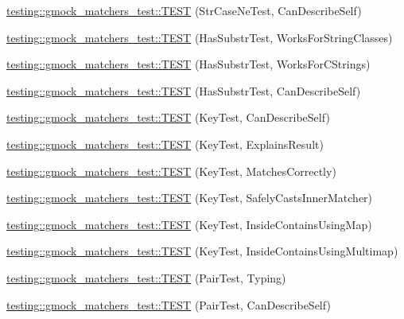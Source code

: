 \begin{DoxyCompactItemize}
\item 
\hyperlink{namespacetesting_1_1gmock__matchers__test_ae953891c7961b6ffd51dc712be8d24de}{testing\+::gmock\+\_\+matchers\+\_\+test\+::\+T\+E\+ST} (Str\+Case\+Ne\+Test, Can\+Describe\+Self)
\item 
\hyperlink{namespacetesting_1_1gmock__matchers__test_a2a1043a0b8bfb4bc0b5fb539317132a3}{testing\+::gmock\+\_\+matchers\+\_\+test\+::\+T\+E\+ST} (Has\+Substr\+Test, Works\+For\+String\+Classes)
\item 
\hyperlink{namespacetesting_1_1gmock__matchers__test_a147dde340ba8f77308cd116d3bb831d6}{testing\+::gmock\+\_\+matchers\+\_\+test\+::\+T\+E\+ST} (Has\+Substr\+Test, Works\+For\+C\+Strings)
\item 
\hyperlink{namespacetesting_1_1gmock__matchers__test_ae47e8ad8f8a4a33ac08b596eb839380e}{testing\+::gmock\+\_\+matchers\+\_\+test\+::\+T\+E\+ST} (Has\+Substr\+Test, Can\+Describe\+Self)
\item 
\hyperlink{namespacetesting_1_1gmock__matchers__test_acdbdca45a537261fd168cdb8df9348d7}{testing\+::gmock\+\_\+matchers\+\_\+test\+::\+T\+E\+ST} (Key\+Test, Can\+Describe\+Self)
\item 
\hyperlink{namespacetesting_1_1gmock__matchers__test_a38169c972e14fef59a41e532fb5b431e}{testing\+::gmock\+\_\+matchers\+\_\+test\+::\+T\+E\+ST} (Key\+Test, Explains\+Result)
\item 
\hyperlink{namespacetesting_1_1gmock__matchers__test_a39f4f76617c414ab715b701eb82eeee4}{testing\+::gmock\+\_\+matchers\+\_\+test\+::\+T\+E\+ST} (Key\+Test, Matches\+Correctly)
\item 
\hyperlink{namespacetesting_1_1gmock__matchers__test_a6b05d274d57a4aa120bb497c34ce3a68}{testing\+::gmock\+\_\+matchers\+\_\+test\+::\+T\+E\+ST} (Key\+Test, Safely\+Casts\+Inner\+Matcher)
\item 
\hyperlink{namespacetesting_1_1gmock__matchers__test_af9f4e295413489a7e3acafc59584c3c4}{testing\+::gmock\+\_\+matchers\+\_\+test\+::\+T\+E\+ST} (Key\+Test, Inside\+Contains\+Using\+Map)
\item 
\hyperlink{namespacetesting_1_1gmock__matchers__test_af90ca00690094484af6c34eadf4dd7c3}{testing\+::gmock\+\_\+matchers\+\_\+test\+::\+T\+E\+ST} (Key\+Test, Inside\+Contains\+Using\+Multimap)
\item 
\hyperlink{namespacetesting_1_1gmock__matchers__test_a5689064ea3fe50424dd1ea036d107aa8}{testing\+::gmock\+\_\+matchers\+\_\+test\+::\+T\+E\+ST} (Pair\+Test, Typing)
\item 
\hyperlink{namespacetesting_1_1gmock__matchers__test_a672ba279448f634fae495ed7dc9260bd}{testing\+::gmock\+\_\+matchers\+\_\+test\+::\+T\+E\+ST} (Pair\+Test, Can\+Describe\+Self)

\end{DoxyCompactItemize}
